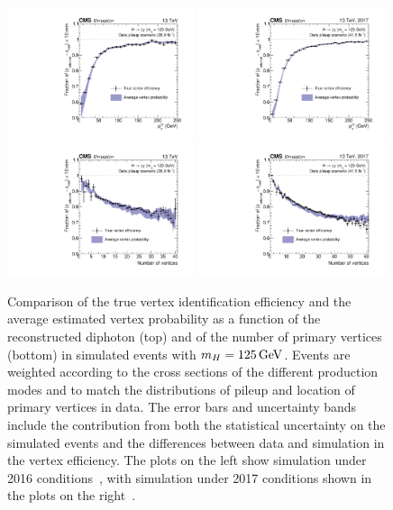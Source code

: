 \begin{figure}[h!]
  \centering
  \includegraphics[width=0.49\textwidth]{Figures/Objects/VtxProbPt2016}
  \includegraphics[width=0.49\textwidth]{Figures/Objects/VtxProbPt2017} \\
  \includegraphics[width=0.49\textwidth]{Figures/Objects/VtxProbNvtx2016}
  \includegraphics[width=0.49\textwidth]{Figures/Objects/VtxProbNvtx2017}
  \caption[Vertex probability validation in simulated \Hgg events.]
  {
    Comparison of the true vertex identification efficiency and the average estimated
    vertex probability as a function of the reconstructed diphoton \pt (top) and of the number of
    primary vertices (bottom) in simulated \Hgg events with $m_{H} = \SI{125}{GeV}$. Events are weighted
    according to the cross sections of the different production modes and to match the distributions
    of pileup and location of primary vertices in data.
    The error bars and uncertainty bands include the contribution from both 
    the statistical uncertainty on the simulated events and the differences between 
    data and simulation in the vertex efficiency.
    The plots on the left show simulation under 2016 conditions~\cite{HIG-16-040}, 
    with simulation under 2017 conditions shown in the plots on the right~\cite{HIG-18-029}.
  }
  \label{fig:obj_VtxProb}
\end{figure}

